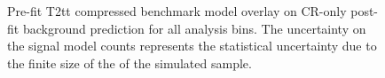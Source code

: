 \begin{figure}[h!]
\begin{center}
{            \label{fig:T2tt_compressed_MR_4j}
        } \\
         ~~
         \\
        \caption{
            Pre-fit T2tt compressed benchmark model overlay on CR-only
            post-fit background prediction for all analysis bins. The
            uncertainty on the signal model counts represents the statistical
            uncertainty due to the finite size of the of the simulated sample.
        }
        \label{fig:T2tt_compressed_MR}
    \end{center}
\end{figure}

